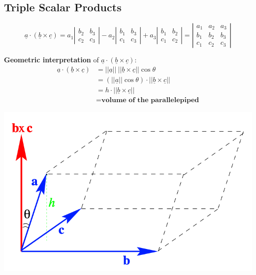 \documentclass[11pt, a4paper]{MATH2023}
\newcommand{\va}{\underline{a}}
\newcommand{\bb}{\underline{b}}
\newcommand{\cc}{\underline{c}}
\begin{document}
\begin{spacing}{1.3}
    \subsection{Triple Scalar Products}
    $$\va\cdot (\bb\times \cc)=a_{1}\left|
    \begin{array}
        {ll}b_{2} & b_{3} \\ 
        c_{2} & c_{3}
    \end{array}\right|-
    a_{2}\left|
    \begin{array}{ll}
        b_{1} & b_{3} \\ 
        c_{1} & c_{3}
    \end{array}\right|+
    a_{3}\left|
    \begin{array}{ll}
        b_{1} & b_{2} \\ 
        c_{1} & c_{2}
    \end{array}\right|=
    \left|
    \begin{array}{lll}
        a_{1} & a_{2} & a_{3} \\ 
        b_{1} & b_{2} & b_{3} \\ 
        c_{1} & c_{2} & c_{3}
    \end{array}\right|$$
    
    {\bf Geometric interpretation} of $\va\cdot (\bb\times \cc)$: 
    \begin{align*}
        \va\cdot (\bb\times \cc) &= ||\va||\ ||\bb\times \cc||\cos\theta \\
        &= \left(||\va||\cos\theta\right)\cdot ||\bb\times \cc||\\
        &= h\cdot ||\bb\times \cc||\\
        &= \textbf{volume of the parallelepiped}
    \end{align*}
    \begin{center}
        \includegraphics[scale=0.5]{images/Ch10-triple-scalar-prod.png}
    \end{center}


\end{spacing}
\end{document}
